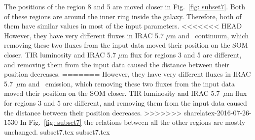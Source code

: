         The positions of the region 8 and 5 are moved closer in Fig.~\ref{fig: subset7}.
        Both of these regions are around the inner ring inside the galaxy.
        Therefore, both of them have similar values in most of the input parameters.
<<<<<<< HEAD
        However, they have very different fluxes in IRAC 5.7 $\mu$m and \sii~continuum, which removing these two fluxes from the input data moved their position on the SOM closer.
        TIR luminosity and IRAC 5.7 $\mu$m flux for regions 3 and 5 are different, and removing them from the input data caused the distance between their position decreases. 
=======
        However, they have very different fluxes in IRAC 5.7~$\mu$m and \sii~emission, which removing these two fluxes from the input data moved their position on the SOM closer.
        TIR luminosity and IRAC 5.7~$\mu$m flux for regions 3 and 5 are different, and removing them from the input data caused the distance between their position decreases. 
>>>>>>> sharelatex-2016-07-26-1530
        In Fig.~\ref{fig: subset7} the relations between all the other regions are mostly unchanged.
        {subset7.tex}
        {subset7.tex}
        